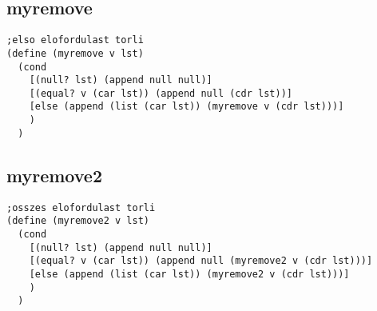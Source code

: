 \begin{multicols}{2}[]
\subsection{myremove}%
\label{sub:myremove}
\begin{lstlisting}
;elso elofordulast torli
(define (myremove v lst)
  (cond
    [(null? lst) (append null null)]
    [(equal? v (car lst)) (append null (cdr lst))]
    [else (append (list (car lst)) (myremove v (cdr lst)))]
    )
  )
\end{lstlisting}

\subsection{myremove2}%
\label{sub:myremove2}
\begin{lstlisting}
;osszes elofordulast torli
(define (myremove2 v lst)
  (cond
    [(null? lst) (append null null)]
    [(equal? v (car lst)) (append null (myremove2 v (cdr lst)))]
    [else (append (list (car lst)) (myremove2 v (cdr lst)))]
    )
  )
\end{lstlisting}
\end{multicols}

